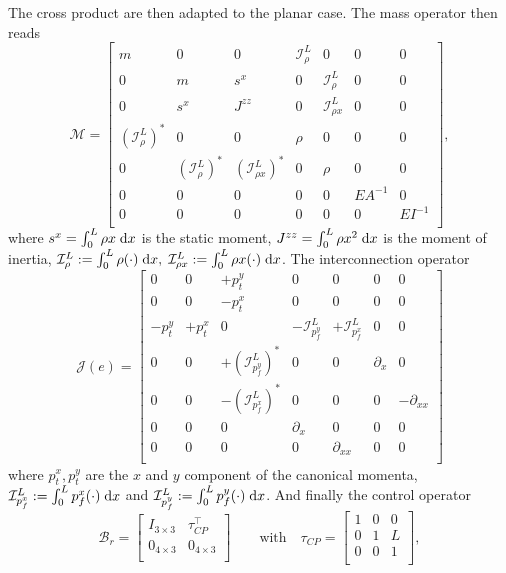 The cross product are then adapted to the planar case. The mass operator then reads
\begin{equation}
\label{eq:EB_M}
\mathcal{M} = 
\begin{bmatrix}
m & 0 & 0 & \mathcal{I}_\rho^L & 0 & 0 & 0 \\
0 & m & s^x & 0 & \mathcal{I}_\rho^L & 0 & 0 \\
0 & s^x & J^{zz} & 0 & \mathcal{I}_{\rho x}^{L} & 0 & 0 \\
(\mathcal{I}_\rho^{L})^* & 0 & 0 & \rho & 0 & 0 & 0  \\
0 & (\mathcal{I}_\rho^{L})^* & (\mathcal{I}_{\rho x}^{L})^* & 0 & \rho & 0 & 0  \\
0 & 0 & 0 & 0 & 0 & {EA}^{-1} & 0 \\
0 & 0 & 0 & 0 & 0 & 0 & {EI}^{-1} \\
\end{bmatrix},
\end{equation}
where  $s^x = \int_{0}^{L} \rho x \d{x}$ is the static moment, $J^{zz} = \int_{0}^{L} \rho x^2 \d{x}$ is the moment of inertia, $\mathcal{I}_\rho^L := \int_{0}^L \rho (\cdot) \d{x}, \; \mathcal{I}_{\rho x}^L := \int_{0}^L \rho x (\cdot) \d{x}$. The interconnection operator 
\begin{equation}
\label{eq:EB_J}
\mathcal{J}(e) = 
\begin{bmatrix}
0 & 0 & +p_t^y      & 0 & 0 & 0 & 0 \\
0 & 0 & -p_t^x     & 0 & 0 & 0 & 0 \\
-p_t^y & +p_t^x & 0 & -\mathcal{I}_{p_f^y}^{L} & +\mathcal{I}_{p_f^x}^{L} & 0 & 0 \\
0 & 0 & +(\mathcal{I}_{p_f^y}^{L})^* & 0 & 0 & \partial_x & 0  \\
0 & 0 & -(\mathcal{I}_{p_f^x}^{L})^* & 0 & 0 & 0 & -\partial_{xx} \\
0 & 0 & 0 & \partial_{x} & 0 & 0 & 0 \\
0 & 0 & 0 & 0 & \partial_{xx} & 0 & 0 \\
\end{bmatrix}
\end{equation}
where $p_t^x, p_t^y$ are the $x$ and $y$ component of the canonical momenta, $\mathcal{I}_{p_f^x}^{L} := \int_{0}^{L} p_f^x (\cdot) \d{x}$ and $\mathcal{I}_{p_f^y}^{L} := \int_{0}^{L} p_f^y (\cdot) \d{x}$. And finally the control operator
\begin{equation}
\mathcal{B}_r = \begin{bmatrix}
I_{3\times 3} & \tau_{CP}^\top \\
0_{4\times 3} & 0_{4\times 3} \\
\end{bmatrix} \qquad \text{with} \quad
\tau_{CP} = \begin{bmatrix}
1 & 0 & 0 \\
0 & 1 & L \\
0 & 0 & 1 \\
\end{bmatrix},
\end{equation}

